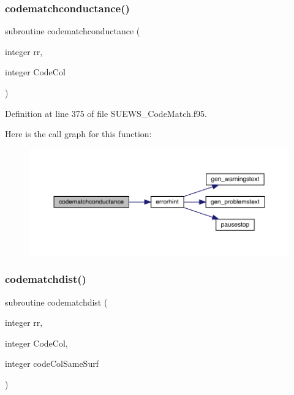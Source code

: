 \subsubsection{\texorpdfstring{codematchconductance()}{codematchconductance()}}
{\footnotesize\ttfamily subroutine codematchconductance (\begin{DoxyParamCaption}\item[{integer}]{rr,  }\item[{integer}]{Code\+Col }\end{DoxyParamCaption})}



Definition at line 375 of file S\+U\+E\+W\+S\+\_\+\+Code\+Match.\+f95.

Here is the call graph for this function\+:\nopagebreak
\begin{figure}[H]
\begin{center}
\leavevmode
\includegraphics[width=350pt]{_s_u_e_w_s___code_match_8f95_aefda6b5266c1784a23433fde9d10cd84_cgraph}
\end{center}
\end{figure}
\mbox{\label{_s_u_e_w_s___code_match_8f95_a3f7412f2da32ab288c3abca74c45c840}} 
\subsubsection{\texorpdfstring{codematchdist()}{codematchdist()}}
{\footnotesize\ttfamily subroutine codematchdist (\begin{DoxyParamCaption}\item[{integer}]{rr,  }\item[{integer}]{Code\+Col,  }\item[{integer}]{code\+Col\+Same\+Surf }\end{DoxyParamCaption})}



